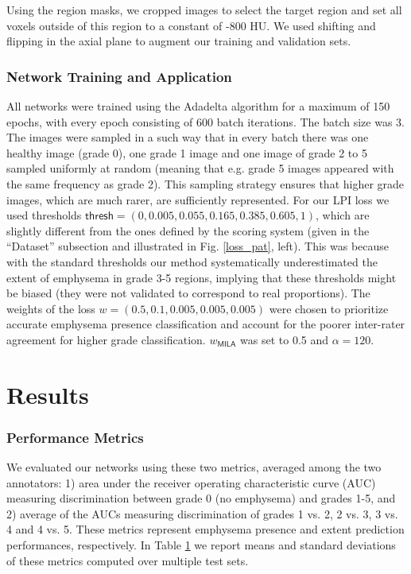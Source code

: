 \documentclass{llncs}
\begin{document}
Using the region masks, we cropped images to select the target region and set all voxels outside of this region to a constant of -800 HU.
We used shifting and flipping in the axial plane to augment our training and validation sets.

\subsubsection{Network Training and Application}
All networks were trained using the Adadelta algorithm for a maximum of 150 epochs, with every epoch consisting of 600 batch iterations.
The batch size was 3.
The images were sampled in a such way that in every batch there was one healthy image (grade 0), one grade 1 image and one image of grade 2 to 5 sampled uniformly at random (meaning that e.g. grade 5 images appeared with the same frequency as grade 2).
This sampling strategy ensures that higher grade images, which are much rarer, are sufficiently represented.
For our LPI loss we used thresholds $\textsf{thresh} = (0, 0.005, 0.055, 0.165, 0.385, 0.605, 1)$, which are slightly different from the ones defined by the scoring system (given in the ``Dataset'' subsection and illustrated in Fig. \ref{loss_pat}, left).
This was because with the standard thresholds our method systematically underestimated the extent of emphysema in grade 3-5 regions, implying that these thresholds might be biased (they were not validated to correspond to real proportions).
The weights of the loss $w = (0.5, 0.1, 0.005, 0.005, 0.005)$ were chosen to prioritize accurate emphysema presence classification and account for the poorer inter-rater agreement for higher grade classification.
$w_\textsf{MILA}$ was set to 0.5 and $\alpha = 120$.

\section{Results}\label{results}

\subsubsection{Performance Metrics}

We evaluated our networks using these two metrics, averaged among the two annotators: 1) area under the receiver operating characteristic curve (AUC) measuring discrimination between grade 0 (no emphysema) and grades 1-5, and 2) average of the AUCs measuring discrimination of grades 1 vs. 2, 2 vs. 3, 3 vs. 4 and 4 vs. 5.
These metrics represent emphysema presence and extent prediction performances, respectively.
In Table \ref{results} we report means and standard deviations of these metrics computed over multiple test sets.
\end{document}
